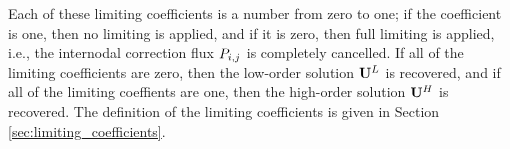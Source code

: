Each of these limiting coefficients is a number from zero to one; if the
coefficient is one, then no limiting is applied, and if it is zero, then full
limiting is applied, i.e., the internodal correction flux
$\MakeUppercase{\correctionfluxletter}\ij$ is completely cancelled. If all of
the limiting coefficients are zero, then the low-order solution
$\lowordersolution$ is recovered, and if all of the limiting coeffients are
one, then the high-order solution $\highordersolution$ is recovered. The
definition of the limiting coefficients is given in Section
\ref{sec:limiting_coefficients}.
